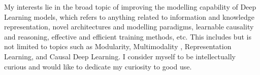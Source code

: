 My interests lie in the broad topic of improving the modelling capability of Deep
Learning models, which refers to anything related to information and knowledge
representation, novel architectures and modelling paradigms, learnable causality and
reasoning, effective and efficient training methods, etc. This includes but is not
limited to topics such as Modularity, Multimodality , Representation Learning, and
Causal Deep Learning. I consider myself to be intellectually curious and would like to
dedicate my curiosity to good use.


